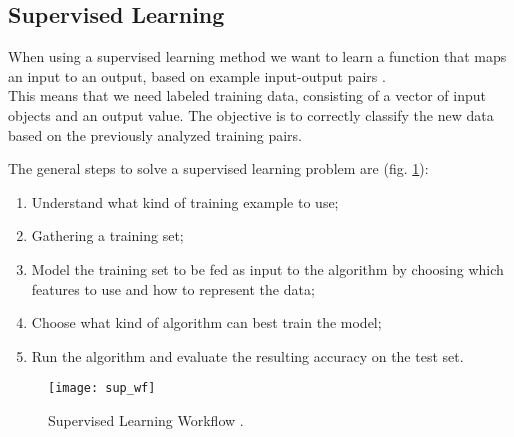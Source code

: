 \subsection{Supervised Learning} \label{supervised}
When using a supervised learning method we want to learn a function that maps an input to an output, based on example input-output pairs \cite{ai_sup}. \\
This means that we need labeled training data, consisting of a vector of input objects and an output value. The objective is to correctly classify the new data based on the previously analyzed training pairs.

The general steps to solve a supervised learning problem are (fig. \ref{fig:sup_wf}):
\begin{enumerate}[noitemsep]
	\item Understand what kind of training example to use;
	\item Gathering a training set;
	\item Model the training set to be fed as input to the algorithm by choosing which features to use and how to represent the data;
	\item Choose what kind of algorithm can best train the model;
	\item Run the algorithm and evaluate the resulting accuracy on the test set.
\end{enumerate}

\begin{figure}[H]
	\centering
	\texttt{[image: sup\_wf]}
	\caption{Supervised Learning Workflow \cite{sup_wf}.}
	\label{fig:sup_wf}
\end{figure}


